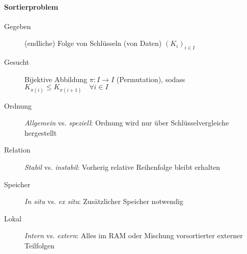 \documentclass[uniLeipzig]{merkzettel}
\begin{document}
\begin{mzImportant}
  \paragraph{Sortierproblem}

  \begin{description}
    \item[Gegeben] (endliche) Folge von Schlüsseln (von Daten) $(K_i)_{i \in I}$
    \item[Gesucht] Bijektive Abbildung $\pi: I \rightarrow I$ (Permutation), sodass $K_{\pi(i)} \leq K_{\pi(i + 1)} \quad \forall i \in I$
  \end{description}
\end{mzImportant}

\begin{mzImportant}
  \begin{description}
    \item [Ordnung] \emph{Allgemein} vs. \emph{speziell}: Ordnung wird nur über Schlüsselvergleiche hergestellt
    \item [Relation] \emph{Stabil} vs. \emph{instabil}: Vorherig relative Reihenfolge bleibt erhalten
    \item [Speicher] \emph{In situ} vs. \emph{ex situ}: Zusätzlicher Speicher notwendig
    \item [Lokal] \emph{Intern} vs. \emph{extern}: Alles im RAM oder Mischung vorsortierter externer Teilfolgen
  \end{description}
\end{mzImportant}
\end{document}
